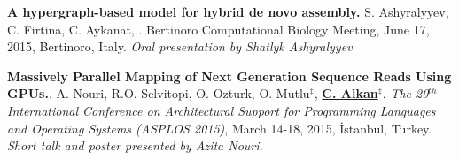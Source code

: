 \vspace{-.2cm}
  {\bf  A hypergraph-based model for hybrid de novo assembly.}
  S. Ashyralyyev, C. Firtina, C. Aykanat, \calkan{}.
  Bertinoro Computational Biology Meeting, June 17, 2015, Bertinoro, Italy. {\it Oral presentation by Shatlyk Ashyralyyev}

\vspace{-.2cm}
 {\bf Massively Parallel Mapping of Next Generation Sequence Reads Using GPUs.}.
  A. Nouri, R.O. Selvitopi, O. Ozturk, O. Mutlu$^\ddag$, {\bf {\underline{C. Alkan}}}$^\ddag$.
{\em The 20$^{th}$ International Conference on Architectural Support for Programming Languages and Operating Systems (ASPLOS 2015)}, 
March 14-18, 2015, İstanbul, Turkey. {\it Short talk and poster presented by Azita Nouri.}


\clearpage
\vspace*{-.4cm}

